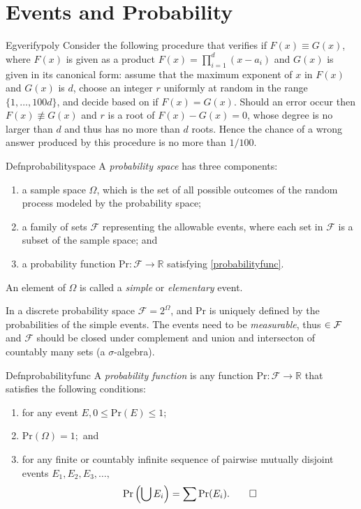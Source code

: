 \chapter{Events and Probability}

\begin{reference}{Eg}{verifypoly}
  Consider the following procedure that verifies if $F(x)\equiv G(x)$, where $F(x)$ is given as a product $F(x)=\prod^d_{i=1}(x-a_i)$ and $G(x)$ is given in its canonical form: assume that the maximum exponent of $x$ in $F(x)$ and $G(x)$ is $d$, choose an integer $r$ uniformly at random in the range $\{1,\dots,100d\}$, and decide based on if $F(x)=G(x)$. Should an error occur then $F(x)\not\equiv G(x)$ and $r$ is a root of $F(x)-G(x)=0$, whose degree is no larger than $d$ and thus has no more than $d$ roots. Hence the chance of a wrong answer produced by this procedure is no more than $1/100$.
\end{reference}

\begin{reference}{Defn}{probabilityspace}
  A \emph{probability space} has three components:
  \begin{enumerate}
    \item
          a sample space $\Omega$, which is the set of all possible outcomes of the random process modeled by the probability space;
    \item
          a family of sets $\mathcal F$ representing the allowable events, where each set in $\mathcal F$ is a subset of the sample space; and
    \item
          a probability function $\mathrm{Pr}:\mathcal F\to \mathbb R$ satisfying \ref{probabilityfunc}.
  \end{enumerate}
  An element of $\Omega$ is called a \emph{simple} or \emph{elementary} event.
\end{reference}

In a discrete probability space $\mathcal F=2^\Omega$, and Pr is uniquely defined by the probabilities of the simple events. The events need to be \textit{measurable}, thus $\empty\in \mathcal F$ and $\mathcal F$ should be closed under complement and union and intersecton of countably many sets (a $\sigma$-algebra).

\begin{reference}{Defn}{probabilityfunc}
  A \emph{probability function} is any function $\mathrm{Pr}:\mathcal F\to \mathbb R$ that satisfies the following conditions:
  \begin{enumerate}
    \item for any event $E,0\leq \mathrm{Pr}(E)\leq 1$;
    \item $\mathrm{Pr}(\Omega)=1;$ and
    \item for any finite or countably infinite sequence of pairwise mutually disjoint events $E_1,E_2,E_3,\dots,$
          \[
            \mathrm{Pr}\left(\bigcup E_i\right)=\sum\mathrm{Pr}(E_i).\qedhere
          \]
  \end{enumerate}
\end{reference}

